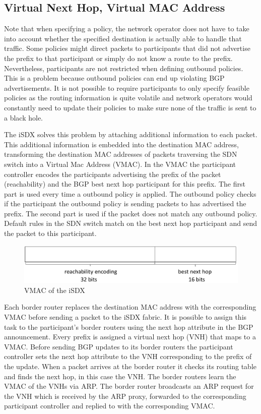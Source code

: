 \subsection{\label{chapter2:iSDX:VNH_VMAC}Virtual Next Hop, Virtual MAC Address}

Note that when specifying a policy, the network operator does not have to take into account whether the specified destination is actually able to handle that traffic. Some policies might direct packets to participants that did not advertise the prefix to that participant or simply do not know a route to the prefix. Nevertheless, participants are not restricted when defining outbound policies. This is a problem because outbound policies can end up violating BGP advertisements. It is not possible to require participants to only specify feasible policies as the routing information is quite volatile and network operators would constantly need to update their policies to make sure none of the traffic is sent to a black hole. 

The iSDX solves this problem by attaching additional information to each packet. This additional information is embedded into the destination MAC address, transforming the destination MAC addresses of packets traversing the SDN switch into a Virtual Mac Address (VMAC).
In the VMAC the participant controller encodes the participants advertising the prefix of the packet (reachability) and the BGP best next hop participant for this prefix. The first part is used every time a outbound policy is applied. The outbound policy checks if the participant the outbound policy is sending packets to has advertised the prefix. The second part is used if the packet does not match any outbound policy. Default rules in the SDN switch match on the best next hop participant and send the packet to this participant.

\begin{figure}[h]
\center
\includegraphics[scale = 0.5]{Figures/sdx_vmac4_cropped.pdf}
\caption{VMAC of the iSDX}
\end{figure}

Each border router replaces the destination MAC address with the corresponding VMAC before sending a packet to the iSDX fabric. It is possible to assign this task to the participant's border routers using the next hop attribute in the BGP announcement. Every prefix is assigned a virtual next hop (VNH) that maps to a VMAC. Before sending BGP updates to its border routers the participant controller sets the next hop attribute to the VNH corresponding to the prefix of the update.  When a packet arrives at the border router it checks its routing table and finds the next hop, in this case the VNH. The border routers learn the VMAC of the VNHs via ARP. The border router broadcasts an ARP request for the VNH which is received by the ARP proxy, forwarded to the corresponding participant controller and replied to with the corresponding VMAC.

